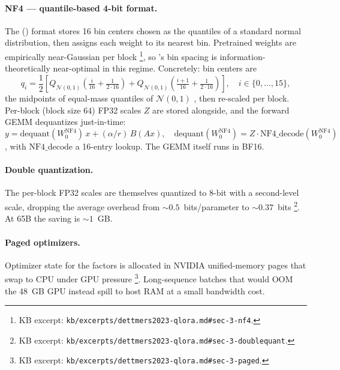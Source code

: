 \paragraph{NF4 — quantile-based 4-bit format.} The
\emph{} () format stores 16 bin centers chosen as the
quantiles of a standard normal distribution, then assigns each weight
to its nearest bin. Pretrained weights are empirically near-Gaussian
per block \citep[\S 3]{dettmers2023-qlora}\footnote{KB excerpt:
\texttt{kb/excerpts/dettmers2023-qlora.md\#sec-3-nf4}.}, so 's bin
spacing is information-theoretically near-optimal in this regime.
Concretely: bin centers are
\begin{equation}
q_i = \frac{1}{2}\!\left[Q_{\mathcal{N}(0,1)}\!\left(\tfrac{i}{16} + \tfrac{1}{2 \cdot 16}\right) + Q_{\mathcal{N}(0,1)}\!\left(\tfrac{i+1}{16} + \tfrac{1}{2 \cdot 16}\right)\right],
\quad i \in \{0,\ldots,15\},
\label{eq:nf4-bins}
\end{equation}
the midpoints of equal-mass quantiles of $\mathcal{N}(0,1)$
\citep[\S 3]{dettmers2023-qlora}, then re-scaled per block. Per-block
(block size 64) FP32 scales $Z$ are stored alongside, and the forward
GEMM dequantizes just-in-time:
\begin{equation}
y = \mathrm{dequant}(W_0^{\text{NF4}})\, x + (\alpha / r)\, B (A x),
\quad
\mathrm{dequant}(W_0^{\text{NF4}}) = Z \cdot \mathrm{NF4\_decode}(W_0^{\text{NF4}})
\label{eq:qlora-fwd}
\end{equation}
\citep[\S 3]{dettmers2023-qlora}, with $\mathrm{NF4\_decode}$ a 16-entry
lookup. The GEMM itself runs in BF16.

\paragraph{Double quantization.} The per-block FP32 scales are
themselves quantized to 8-bit with a second-level scale, dropping the
average overhead from $\sim\!0.5$~bits/parameter to $\sim\!0.37$~bits
\citep[\S 3]{dettmers2023-qlora}\footnote{KB excerpt:
\texttt{kb/excerpts/dettmers2023-qlora.md\#sec-3-doublequant}.}. At
65B  the saving is $\sim\!1$~GB.

\paragraph{Paged optimizers.} Optimizer state for the  factors is
allocated in NVIDIA unified-memory pages that swap to CPU under GPU
pressure \citep[\S 3]{dettmers2023-qlora}\footnote{KB excerpt:
\texttt{kb/excerpts/dettmers2023-qlora.md\#sec-3-paged}.}. Long-sequence
batches that would OOM the 48~GB GPU instead spill to host RAM at a
small bandwidth cost.

